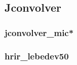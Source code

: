 \documentclass[10pt,a4paper]{article}
\begin{document}
\pagebreak
\subsection{Jconvolver}
\subsubsection{jconvolver\_mic*}
\subsubsection{hrir\_lebedev50}


\end{document}
